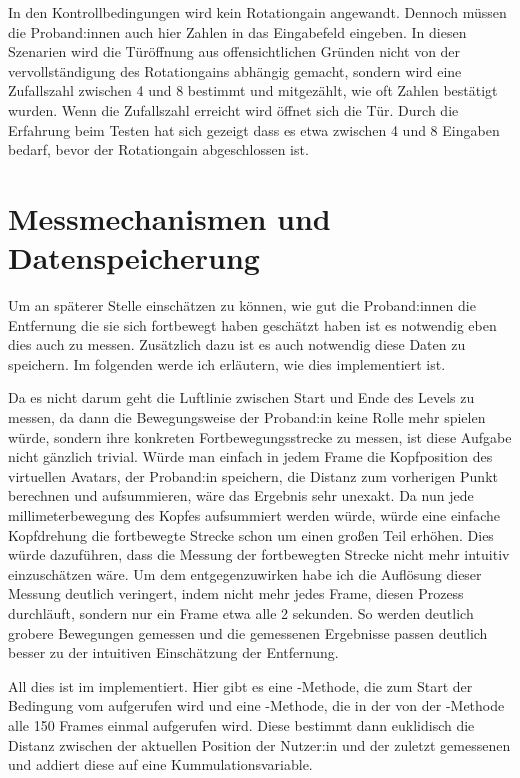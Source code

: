In den Kontrollbedingungen wird kein Rotationgain angewandt. Dennoch müssen die Proband:innen auch hier Zahlen in das Eingabefeld eingeben. In diesen Szenarien wird die Türöffnung aus offensichtlichen Gründen nicht von der vervollständigung des Rotationgains abhängig gemacht, sondern wird eine Zufallszahl zwischen 4 und 8 bestimmt und mitgezählt, wie oft Zahlen bestätigt wurden. Wenn die Zufallszahl erreicht wird öffnet sich die Tür. Durch die Erfahrung beim Testen hat sich gezeigt dass es etwa zwischen 4 und 8 Eingaben bedarf, bevor der Rotationgain abgeschlossen ist.

\section{Messmechanismen und Datenspeicherung}
Um an späterer Stelle einschätzen zu können, wie gut die Proband:innen die Entfernung die sie sich fortbewegt haben geschätzt haben ist es notwendig eben dies auch zu messen. Zusätzlich dazu ist es auch notwendig diese Daten zu speichern. Im folgenden werde ich erläutern, wie dies implementiert ist.

Da es nicht darum geht die Luftlinie zwischen Start und Ende des Levels zu messen, da dann die Bewegungsweise der Proband:in keine Rolle mehr spielen würde, sondern ihre konkreten Fortbewegungsstrecke zu messen, ist diese Aufgabe nicht gänzlich trivial. Würde man einfach in jedem Frame die Kopfposition des virtuellen Avatars, der Proband:in speichern, die Distanz zum vorherigen Punkt berechnen und aufsummieren, wäre das Ergebnis sehr unexakt. %
Da nun jede millimeterbewegung des Kopfes aufsummiert werden würde, würde eine einfache Kopfdrehung die fortbewegte Strecke schon um einen großen Teil erhöhen. Dies würde dazuführen, dass die Messung der fortbewegten Strecke nicht mehr intuitiv einzuschätzen wäre.
Um dem entgegenzuwirken habe ich die Auflösung dieser Messung deutlich veringert, indem nicht mehr jedes Frame, diesen Prozess durchläuft, sondern nur ein Frame etwa alle 2 sekunden. So werden deutlich grobere Bewegungen gemessen und die gemessenen Ergebnisse passen deutlich besser zu der intuitiven Einschätzung der Entfernung.

All dies ist im  implementiert. Hier gibt es eine -Methode, die zum Start der Bedingung vom  aufgerufen wird und eine -Methode, die in der von der -Methode alle 150 Frames einmal aufgerufen wird. Diese bestimmt dann euklidisch die Distanz zwischen der aktuellen Position der Nutzer:in und der zuletzt gemessenen und addiert diese auf eine Kummulationsvariable.


